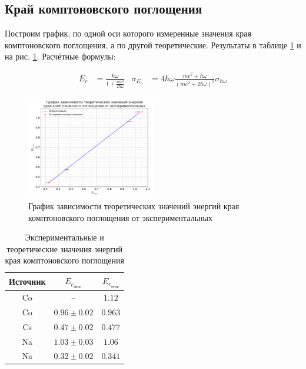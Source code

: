 \documentclass[a4paper, 12pt]{article}
\begin{document}
        \subsection{Край комптоновского поглощения}

            Построим график, по одной оси которого измеренные значения края комптоновского поглощения, а по другой теоретические. Результаты в таблице \ref{tab:compton} и на рис. \ref{plot:compton}. Расчётные формулы:

            \begin{align*}
                E_c &= \frac{\hbar \omega}{1 + \frac{mc^2}{2 \hbar \omega}} & \sigma_{E_c} &= 4 \hbar \omega \frac{mc^2 + \hbar \omega}{(mc^2 + 2\hbar \omega)^2} \sigma_{\hbar \omega}
            \end{align*}

            \begin{figure}[ht!]
                \begin{center}
                    \includegraphics[width = 0.5\textwidth]{img/compton.png}
                    \caption{График зависимости теоретических значений энергий края комптоновского поглощения от экспериментальных}
                    \label{plot:compton}
                \end{center}
            \end{figure}

            \begin{table}[!ht]
                \centering
                \begin{tabular}{|c|c|c|}
                    \hline

                    Источник & $E_{c_{эксп}}$ & $E_{c_{теор}}$\\ \hline
                    Co & -- & $1.12$\\ \hline
                    Co & $0.96 \pm 0.02$ & $0.963$\\ \hline
                    Cs & $0.47 \pm 0.02$ & $0.477$\\ \hline
                    Na & $1.03 \pm 0.03$ & $1.06$\\ \hline
                    Na & $0.32 \pm 0.02$ & $0.341$\\ \hline

                \end{tabular}
                \caption{Экспериментальные и теоретические значения энергий края комптоновского поглощения}
                \label{tab:compton}
            \end{table}
\end{document}

